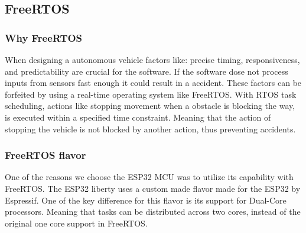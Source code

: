 \documentclass[../report.tex]{subfiles}
\begin{document}
    \subsection{FreeRTOS}
    \subsubsection{Why FreeRTOS}
    When designing a autonomous vehicle factors like: precise timing,
    responsiveness, and predictability are crucial for the software.
    If the software dose not process inputs from sensors fast enough it could
    result in a accident. These factors can be forfeited by using a real-time
    operating system like FreeRTOS. With RTOS task scheduling, actions like
    stopping movement when a obstacle is blocking the way, is executed within a
    specified time constraint. Meaning that the action of stopping the vehicle
    is not blocked by another action, thus preventing accidents.

    \subsubsection{FreeRTOS flavor}
    One of the reasons we choose the ESP32 MCU was to utilize its capability
    with FreeRTOS. The ESP32 liberty uses a custom made flavor made for the
    ESP32 by Espressif. One of the key difference for this flavor is its
    support for Dual-Core processors. Meaning that tasks can be distributed
    across two cores, instead of the original one core support in FreeRTOS.
\end{document}
